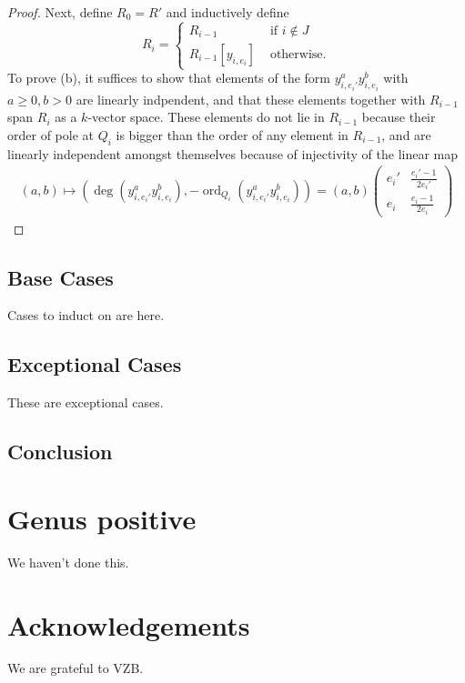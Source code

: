 \documentclass{amsart}
\theoremstyle{plain}
\theoremstyle{definition}
\theoremstyle{remark}
\numberwithin{equation}{section}
\newcommand\ssec{\subsection}
\DeclareMathOperator{\ord}{ord}
\newcommand \subhalf[1]{\frac{{#1} - 1}{2{#1}}}
\begin{document}
\begin{proof}
Next, define $R_0 = R'$ and inductively define 
$$
R_i = \begin{cases}
	R_{i-1} &\text{ if }i \notin J\\
	R_{i-1}[y_{i,e_i}] &\text{ otherwise.} 
\end{cases}$$
To prove (b), it suffices to show that elements of the form $y_{i,e_i'}^ay_{i,e_i}^b$ with $a \geq 0, b > 0$ are linearly indpendent, and that these elements together with $R_{i-1}$ span $R_i$ as a $k$-vector space. These elements do not lie in $R_{i-1}$ because their order of pole at $Q_i$ is bigger than the order of any element in $R_{i-1}$, and are linearly independent amongst themselves because of injectivity of the linear map
\begin{align*}
	(a,b) \mapsto \left( \deg\left(y_{i,e_i'}^ay_{i,e_i}^b\right),-\ord_{Q_i}\left( y_{i,e_i'}^ay_{i,e_i}^b \right)  \right) = (a,b) \begin{pmatrix}
	e_i' & \subhalf{e_i'} \\
	e_i	 & \subhalf{e_i}
\end{pmatrix} 
\end{align*}


\end{proof}

\ssec{Base Cases}
\label{ssec:g_0_base}
Cases to induct on are here.

\ssec{Exceptional Cases}
\label{ssec:g_0_exceptional}
These are exceptional cases.

\ssec{Conclusion}
\label{ssec:g_0_conclusion}

\section{Genus positive}
We haven't done this.

\section{Acknowledgements}
We are grateful to VZB.

\nocite{*}
{}

\end{document}

